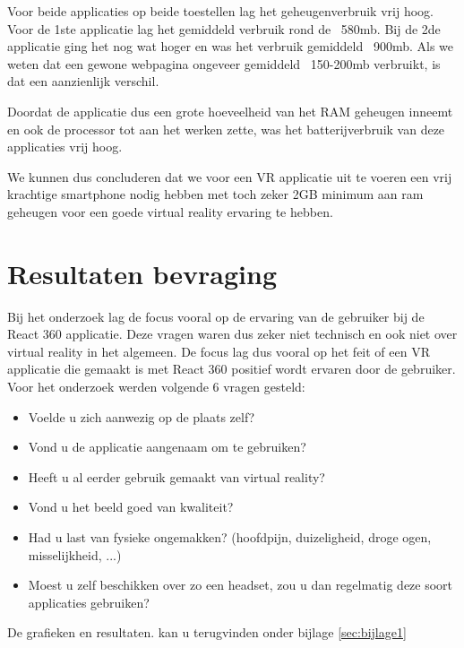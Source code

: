 Voor beide applicaties op beide toestellen lag het geheugenverbruik vrij hoog. Voor de 1ste applicatie lag het gemiddeld verbruik rond de ~580mb. Bij de 2de applicatie ging het nog wat hoger en was het verbruik gemiddeld ~900mb.  Als we weten dat een gewone webpagina ongeveer gemiddeld ~150-200mb verbruikt, is dat een aanzienlijk verschil.

Doordat de applicatie dus een grote hoeveelheid van het RAM geheugen inneemt en ook de processor tot aan het werken zette, was het batterijverbruik van deze applicaties vrij hoog.

We kunnen dus concluderen dat we voor een VR applicatie uit te voeren een vrij krachtige smartphone nodig hebben met toch zeker 2GB minimum aan ram geheugen voor een goede virtual reality ervaring te hebben.

\section{Resultaten bevraging}
\label{sec:resulaten-apps}
Bij het onderzoek lag de focus vooral op de ervaring van de gebruiker bij de React 360 applicatie. Deze vragen waren dus zeker niet technisch en ook niet over virtual reality in het algemeen. De focus lag dus vooral op het feit of een VR applicatie die gemaakt is met React 360 positief wordt ervaren door de gebruiker. Voor het onderzoek werden volgende 6 vragen gesteld:

\begin{itemize}
	\item Voelde u zich aanwezig op de plaats zelf?
	\item Vond u de applicatie aangenaam om te gebruiken?
	\item Heeft u al eerder gebruik gemaakt van virtual reality?
	\item Vond u het beeld goed van kwaliteit?
	\item Had u last van fysieke ongemakken? (hoofdpijn, duizeligheid, droge ogen, misselijkheid, ...)
	\item Moest u zelf beschikken over zo een headset, zou u dan regelmatig deze soort applicaties gebruiken? 
\end{itemize}

De grafieken en resultaten. kan u terugvinden onder bijlage \ref{sec:bijlage1}

